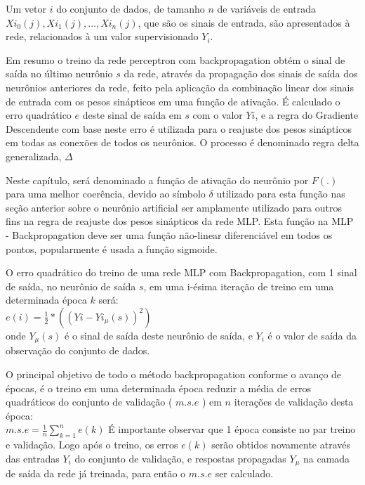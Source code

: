 \documentclass[	12pt, Times, openright, twoside, a4paper, english, brazil]{abntex2}
\begin{document}
            Um vetor $i$ do conjunto de dados, de tamanho $n$ de variáveis de entrada\\ $Xi_{0}(j),Xi_{1}(j),...,Xi_{n}(j)$, que são os sinais de entrada, são apresentados à rede, relacionados à um valor supervisionado $Y_i$.
            
            Em resumo o treino da rede perceptron com backpropagation obtém o sinal de saída no último neurônio $s$ da rede, através da propagação dos sinais de saída dos neurônios anteriores da rede, feito pela aplicação da combinação linear dos sinais de entrada com os pesos sinápticos em uma função de ativação. É calculado o erro quadrático $e$ deste sinal de saída em $s$ com o valor $Yi$, e a regra do Gradiente Descendente com base neste erro é utilizada para o reajuste dos pesos sinápticos em todas as conexões de todos os neurônios. O processo é denominado regra delta generalizada, $\Delta$
            
            Neste capítulo, será denominado a função de ativação do neurônio por $F(.)$ para uma melhor coerência, devido ao símbolo $\delta$ utilizado para esta função nas seção anterior sobre o neurônio artificial ser amplamente utilizado para outros fins na regra de reajuste dos pesos sinápticos da rede MLP. Esta função na MLP - Backpropagation deve ser uma função não-linear diferenciável em todos os pontos, popularmente é usada a função sigmoide.
            
            O erro quadrático do treino de uma rede MLP com Backpropagation, com 1 sinal de saída, no neurônio de saída $s$, em uma i-ésima iteração de treino em uma determinada época $k$ será:\\ 
            $ e(i) =\frac{1}{2}*( (Yi-Yi_{\mu}(s))^2 ) $\\ onde $Y_{\mu}(s)$ é o sinal de saída deste neurônio de saída, e $Y_i$ é o valor de saída da observação do conjunto de dados.
            
            O principal objetivo de todo o método backpropagation conforme o avanço de épocas, é o treino em uma determinada época reduzir a média de erros quadráticos do conjunto de validação ( $m.s.e$ ) em $n$ iterações de validação desta época:\\
            $m.s.e = \frac{1}{n} \sum_{k=1}^{n}e(k)$
            É importante observar que 1 época consiste no par treino e validação. Logo após o treino, os erros $e(k)$ serão obtidos novamente através das entradas $Y_i$ do conjunto de validação, e respostas propagadas $Y_\mu$ na camada de saída da rede já treinada, para então o $m.s.e$ ser calculado.
            
\end{document}
